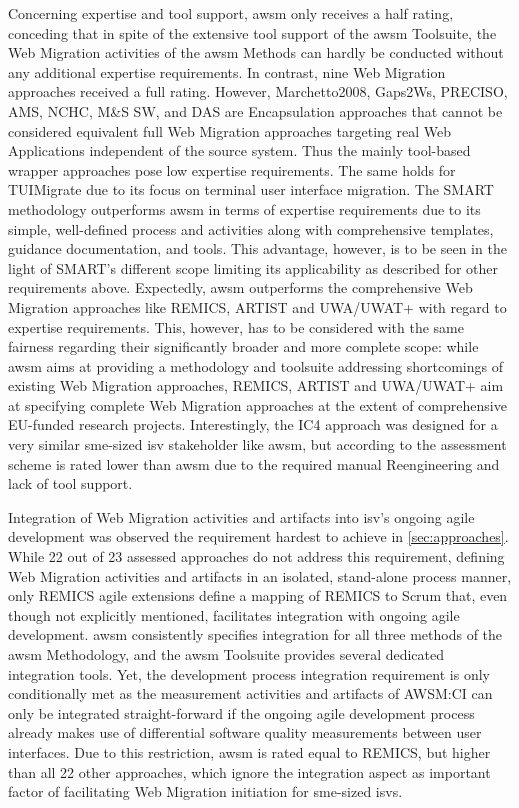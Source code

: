 Concerning expertise and tool support, \gls{awsm} only receives a half rating, conceding that in spite of the extensive tool support of the \gls{awsm} Toolsuite, the \gls{Web Migration} activities of the \gls{awsm} Methods can hardly be conducted without any additional expertise requirements.
In contrast, nine \gls{Web Migration} approaches received a full rating.
However, Marchetto2008, Gaps2Ws, PRECISO, AMS, NCHC, M\&S SW, and DAS are \gls{Encapsulation} approaches that cannot be considered equivalent full \gls{Web Migration} approaches targeting real \glspl{Web Application} independent of the \gls{source system}.
Thus the mainly tool-based wrapper approaches pose low expertise requirements.
The same holds for TUIMigrate due to its focus on terminal user interface migration.
The SMART methodology outperforms \gls{awsm} in terms of expertise requirements due to its simple, well-defined process and activities along with comprehensive templates, guidance documentation, and tools.
This advantage, however, is to be seen in the light of SMART's different scope limiting its applicability as described for other requirements above.
Expectedly, \gls{awsm} outperforms the comprehensive \gls{Web Migration} approaches like REMICS, ARTIST and UWA/UWAT+ with regard to expertise requirements.
This, however, has to be considered with the same fairness regarding their significantly broader and more complete scope: while \gls{awsm} aims at providing a methodology and toolsuite addressing shortcomings of existing \gls{Web Migration} approaches, REMICS, ARTIST and UWA/UWAT+ aim at specifying complete \gls{Web Migration} approaches at the extent of comprehensive EU-funded research projects.
Interestingly, the IC4 approach was designed for a very similar \gls{sme}-sized \gls{isv} stakeholder like \gls{awsm}, but according to the assessment scheme is rated lower than \gls{awsm} due to the required manual \gls{Reengineering} and lack of tool support.

Integration of \gls{Web Migration} activities and \glspl{artifact} into \gls{isv}'s ongoing agile development was observed the requirement hardest to achieve in \cref{sec:approaches}.
While 22 out of 23 assessed approaches do not address this requirement, defining \gls{Web Migration} activities and \glspl{artifact} in an isolated, stand-alone process manner, only REMICS agile extensions define a mapping of REMICS to Scrum that, even though not explicitly mentioned, facilitates integration with ongoing agile development.
\gls{awsm} consistently specifies integration for all three methods of the \gls{awsm} Methodology, and the \gls{awsm} Toolsuite provides several dedicated integration tools.
Yet, the development process integration requirement is only conditionally met as the measurement activities and \glspl{artifact} of AWSM:CI can only be integrated straight-forward if the ongoing agile development process already makes use of differential software quality measurements between user interfaces.
Due to this restriction, \gls{awsm} is rated equal to REMICS, but higher than all 22 other approaches, which ignore the integration aspect as important factor of facilitating \gls{Web Migration} initiation for \gls{sme}-sized \glspl{isv}.

